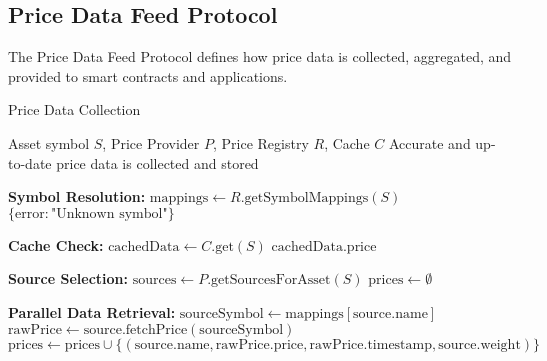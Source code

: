\subsection{Price Data Feed Protocol}
\label{subsec:price-feed-protocol}

The Price Data Feed Protocol defines how price data is collected, aggregated, and provided to smart contracts and applications.

\begin{tcolorbox}[
    enhanced,
    colback=blue!5!white,
    colframe=blue!75!black,
    arc=5mm,
    boxrule=1.5pt,
    title=Price Feed Protocol,
    fonttitle=\bfseries,
    coltitle=white,
    attach boxed title to top left={yshift=-2mm, xshift=5mm},
    boxed title style={colback=blue!75!black, rounded corners},
    shadow={2mm}{-2mm}{0mm}{black!50},
    drop fuzzy shadow
]
\begin{tcolorbox}[
    enhanced,
    colback=blue!5!white,
    colframe=blue!75!black,
    arc=5mm,
    boxrule=1.5pt,
    title=Protocol,
    fonttitle=\bfseries,
    coltitle=white,
    attach boxed title to top left={yshift=-2mm, xshift=5mm},
    boxed title style={colback=blue!75!black, rounded corners},
    shadow={2mm}{-2mm}{0mm}{black!50},
    drop fuzzy shadow
]
\begin{protocol}{Price Data Collection}
\label{prot:price-data-collection}
\begin{algorithmic}[1]
\Require Asset symbol $S$, Price Provider $P$, Price Registry $R$, Cache $C$
\Ensure Accurate and up-to-date price data is collected and stored

\State \textbf{Symbol Resolution:}
\State $\text{mappings} \gets R.\text{getSymbolMappings}(S)$
    \State \Return $\{\text{error}: \text{"Unknown symbol"}\}$
\EndIf

\State \textbf{Cache Check:}
\State $\text{cachedData} \gets C.\text{get}(S)$
    \State \Return $\text{cachedData}.\text{price}$
\EndIf

\State \textbf{Source Selection:}
\State $\text{sources} \gets P.\text{getSourcesForAsset}(S)$
\State $\text{prices} \gets \emptyset$

\State \textbf{Parallel Data Retrieval:}
    \State $\text{sourceSymbol} \gets \text{mappings}[\text{source}.\text{name}]$
    \State $\text{rawPrice} \gets \text{source}.\text{fetchPrice}(\text{sourceSymbol})$
        \State $\text{prices} \gets \text{prices} \cup \{(\text{source}.\text{name}, \text{rawPrice}.\text{price}, \text{rawPrice}.\text{timestamp}, \text{source}.\text{weight})\}$
    \EndIf
\EndFor


\end{algorithmic}
\end{protocol}
\end{tcolorbox}
\end{tcolorbox}
